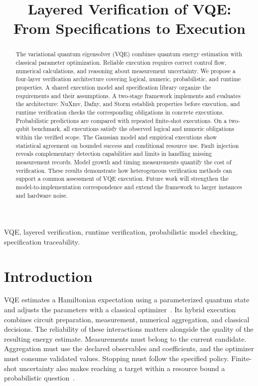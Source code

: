 \documentclass[conference]{IEEEtran}
\author{}
\title{Layered Verification of VQE:\\From Specifications to Execution}
\begin{document}
\raggedbottom
\maketitle
\begin{abstract}
The variational quantum eigensolver (VQE) combines quantum energy estimation with classical parameter optimization. Reliable execution requires correct control flow, numerical calculations, and reasoning about measurement uncertainty. We propose a four-layer verification architecture covering logical, numeric, probabilistic, and runtime properties. A shared execution model and specification library organize the requirements and their assumptions. A two-stage framework implements and evaluates the architecture: NuXmv, Dafny, and Storm establish properties before execution, and runtime verification checks the corresponding obligations in concrete executions. Probabilistic predictions are compared with repeated finite-shot executions. On a two-qubit benchmark, all \BaselineRuns executions satisfy the observed logical and numeric obligations within the verified scope. The Gaussian model and empirical executions show statistical agreement on bounded success and conditional resource use. Fault injection reveals complementary detection capabilities and limits in handling missing measurement records. Model growth and timing measurements quantify the cost of verification. These results demonstrate how heterogeneous verification methods can support a common assessment of VQE execution. Future work will strengthen the model-to-implementation correspondence and extend the framework to larger instances and hardware noise.
\end{abstract}
\begin{IEEEkeywords}
VQE, layered verification, runtime verification, probabilistic model checking, specification traceability.
\end{IEEEkeywords}

\section{Introduction}
\label{sec:introduction}
VQE estimates a Hamiltonian expectation using a parameterized quantum state and adjusts the parameters with a classical optimizer~\cite{peruzzo2014,mcclean2016}. Its hybrid execution combines circuit preparation, measurement, numerical aggregation, and classical decisions. The reliability of these interactions matters alongside the quality of the resulting energy estimate. Measurements must belong to the current candidate. Aggregation must use the declared observables and coefficients, and the optimizer must consume validated values. Stopping must follow the specified policy. Finite-shot uncertainty also makes reaching a target within a resource bound a probabilistic question~\cite{tilly2022}.
\end{document}
